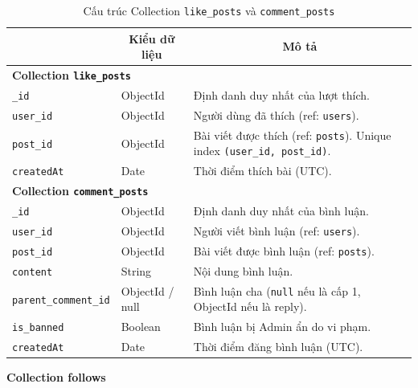 \begin{table}[H]
\centering
\footnotesize
\setlength{\tabcolsep}{5pt}
\renewcommand{\arraystretch}{1.15}
\begin{tabularx}{\textwidth}{|p{3.6cm}|p{2.6cm}|X|}
\hline
\rowcolor{dbheadblue}
\multicolumn{1}{|c|}{\color{white}\textbf{Trường}} &
\multicolumn{1}{c|}{\color{white}\textbf{Kiểu dữ liệu}} &
\multicolumn{1}{c|}{\color{white}\textbf{Mô tả}} \\
\hline
\multicolumn{3}{|l|}{\textbf{Collection \texttt{like\_posts}}} \\ \hline
\rowcolor{dbrowalt}
\texttt{\_id}       & ObjectId & Định danh duy nhất của lượt thích. \\ \hline
\texttt{user\_id}   & ObjectId & Người dùng đã thích (ref: \texttt{users}). \\ \hline
\rowcolor{dbrowalt}
\texttt{post\_id}   & ObjectId & Bài viết được thích (ref: \texttt{posts}). Unique index \texttt{(user\_id, post\_id)}. \\ \hline
\texttt{createdAt} & Date     & Thời điểm thích bài (UTC). \\ \hline
\hline
\multicolumn{3}{|l|}{\textbf{Collection \texttt{comment\_posts}}} \\ \hline
\rowcolor{dbrowalt}
\texttt{\_id}                & ObjectId        & Định danh duy nhất của bình luận. \\ \hline
\texttt{user\_id}            & ObjectId        & Người viết bình luận (ref: \texttt{users}). \\ \hline
\rowcolor{dbrowalt}
\texttt{post\_id}            & ObjectId        & Bài viết được bình luận (ref: \texttt{posts}). \\ \hline
\texttt{content}            & String          & Nội dung bình luận. \\ \hline
\rowcolor{dbrowalt}
\texttt{parent\_comment\_id} & ObjectId / null & Bình luận cha (\texttt{null} nếu là cấp 1, ObjectId nếu là reply). \\ \hline
\texttt{is\_banned}          & Boolean         & Bình luận bị Admin ẩn do vi phạm. \\ \hline
\rowcolor{dbrowalt}
\texttt{createdAt}          & Date            & Thời điểm đăng bình luận (UTC). \\ \hline
\end{tabularx}
\caption{Cấu trúc Collection \texttt{like\_posts} và \texttt{comment\_posts}}
\label{tab:col_interactions}
\end{table}

\textbf{Collection follows}
\label{subsec:col_follows}

